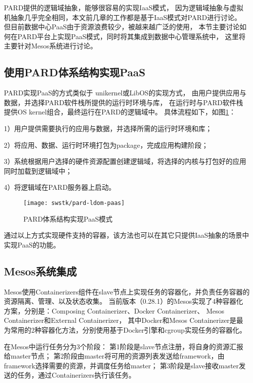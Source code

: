 PARD提供的逻辑域抽象，能够很容易的实现IaaS模式，
因为逻辑域抽象与虚拟机抽象几乎完全相同，本文前几章的工作都是基于IaaS模式对PARD进行讨论。
但目前数据中心PaaS由于资源浪费较少，被越来越广泛的使用，
本节主要讨论如何在PARD平台上实现PaaS模式，同时将其集成到数据中心管理系统中，
这里将主要针对Mesos系统进行讨论。

\subsection{使用PARD体系结构实现PaaS}
PARD实现PaaS的方式类似于
unikernel\cite{Unikernels:2013}或LibOS\cite{Porter:2011}的实现方式，
由用户提供应用与数据，并选择PARD软件栈所提供的运行时环境与库，
在运行时与PARD软件栈提供OS kernel组合，最终运行在PARD的逻辑域中。
具体流程如下，如图\ref{fig:pard-ldom-paas}：

1）用户提供需要执行的应用与数据，并选择所需的运行时环境和库；

2）将应用、数据、运行时环境打包为package，完成应用构建阶段；

3）系统根据用户选择的硬件资源配置创建逻辑域，将选择的内核与打包好的应用同时加载到逻辑域中；

4）将逻辑域在PARD服务器上启动。

\begin{figure}[tb]
  \centering
  \texttt{[image: swstk/pard-ldom-paas]}
  \caption{PARD体系结构实现PaaS模式}
  \label{fig:pard-ldom-paas}
\end{figure}

通过以上方式实现硬件支持的容器，该方法也可以在其它只提供IaaS抽象的场景中实现PaaS的功能。

\subsection{Mesos系统集成}

Mesos使用Containerizers组件在slave节点上实现任务的容器化，并负责任务容器的资源隔离、管理、以及状态收集。
当前版本（0.28.1）的Mesos实现了4种容器化方案，分别是：Composing Containerizer、Docker Containerizer、
Mesos Containerizer和External Containerizer，
其中Docker和Mesos Containerizer是最为常用的2种容器化方法，分别使用基于Docker引擎和cgroup实现任务的容器化。

在Mesos中运行任务分为3个阶段：
第1阶段是slave节点注册，将自身的资源汇报给master节点；
第2阶段由master将可用的资源列表发送给framework，由framework选择需要的资源，并调度任务给master；
第3阶段是slave接收master发送的任务，通过Containerizers执行该任务。

